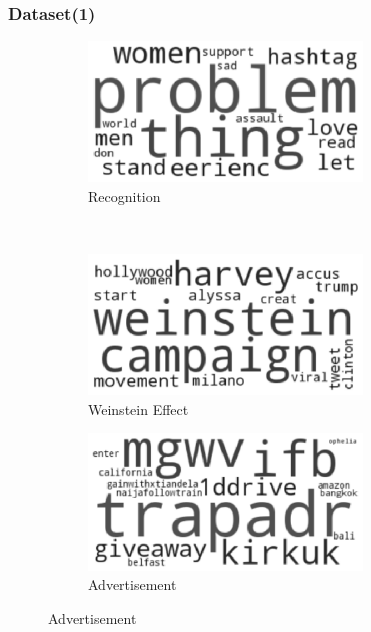\documentclass{beamer}
\begin{document}
	\begin{frame}
		\frametitle{Dataset(1)}
		\begin{figure}[h]
			\centering
			\begin{subfigure}{0.45\textwidth}
				\includegraphics[width=0.8\textwidth]{SS61.eps}
				\centering
				\caption{Recognition}
			\end{subfigure}\pause
			~
			\begin{subfigure}{0.45\textwidth}
				\includegraphics[width=0.8\textwidth]{SS62.eps}
				\centering
				\caption{Weinstein Effect}
			\end{subfigure}\pause
		
			\begin{subfigure}{0.45\textwidth}
				\includegraphics[width=0.8\textwidth]{SS63.eps}
				\centering
				\caption{Advertisement}
			\end{subfigure}
		\end{figure}
	\end{frame}
\end{document}
